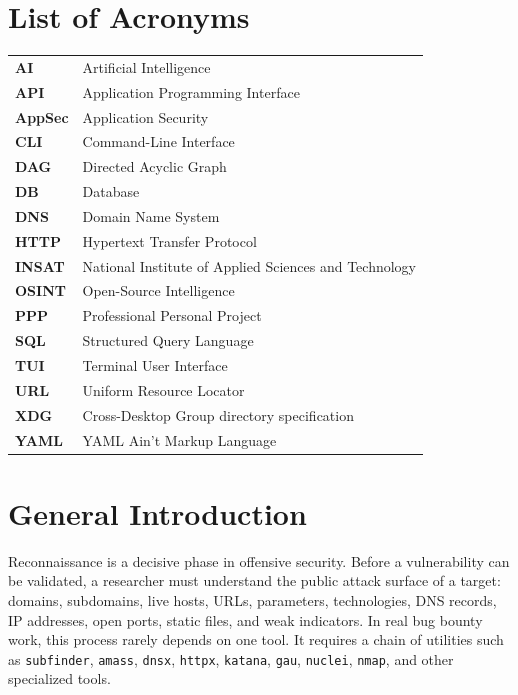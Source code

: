 \documentclass[a4paper,12pt]{article}
\begin{document}
\clearpage
{}
\tableofcontents

\clearpage
{}
{}
\listoftables

\clearpage
{}
\section*{List of Acronyms}

\begin{longtable}{>{\bfseries}p{3cm}p{11cm}}
AI & Artificial Intelligence \\
API & Application Programming Interface \\
AppSec & Application Security \\
CLI & Command-Line Interface \\
DAG & Directed Acyclic Graph \\
DB & Database \\
DNS & Domain Name System \\
HTTP & Hypertext Transfer Protocol \\
INSAT & National Institute of Applied Sciences and Technology \\
OSINT & Open-Source Intelligence \\
PPP & Professional Personal Project \\
SQL & Structured Query Language \\
TUI & Terminal User Interface \\
URL & Uniform Resource Locator \\
XDG & Cross-Desktop Group directory specification \\
YAML & YAML Ain't Markup Language \\
\end{longtable}

\clearpage
{}
\section*{General Introduction}

Reconnaissance is a decisive phase in offensive security. Before a vulnerability can be validated, a researcher must understand the public attack surface of a target: domains, subdomains, live hosts, URLs, parameters, technologies, DNS records, IP addresses, open ports, static files, and weak indicators. In real bug bounty work, this process rarely depends on one tool. It requires a chain of utilities such as \texttt{subfinder}, \texttt{amass}, \texttt{dnsx}, \texttt{httpx}, \texttt{katana}, \texttt{gau}, \texttt{nuclei}, \texttt{nmap}, and other specialized tools.
\end{document}
